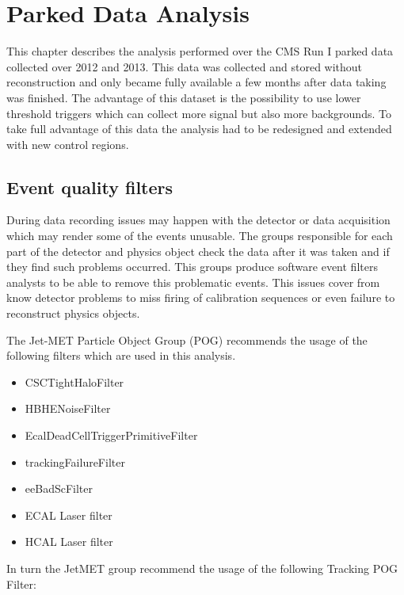 \chapter{Parked Data Analysis}
\label{CHAPTER:ParkedDataAnalysis}

\glsresetall %

This chapter describes the analysis performed over the \gls{CMS} Run I parked data collected over 2012 and 2013. This data was collected and stored without reconstruction and only became fully available a few months after data taking was finished. The advantage of this dataset is the possibility to use lower threshold triggers which can collect more signal but also more backgrounds. To take full advantage of this data the analysis had to be redesigned and extended with new control regions.


\section{Event quality filters}

During data recording issues may happen with the detector or data acquisition which may render some of the events unusable. The groups responsible for each part of the detector and physics object check the data after it was taken and if they find such problems occurred. This groups produce software event filters analysts to be able to remove this problematic events. This issues cover from know detector problems to miss firing of calibration sequences or even failure to reconstruct physics objects.

The Jet-MET Particle Object Group (POG) recommends the usage of the following filters which are used in this analysis.

\begin{itemize}
  \item CSCTightHaloFilter
  \item HBHENoiseFilter
  \item EcalDeadCellTriggerPrimitiveFilter
  \item trackingFailureFilter
  \item eeBadScFilter
  \item ECAL Laser filter
  \item HCAL Laser filter
\end{itemize}

In turn the JetMET group recommend the usage of the following Tracking POG Filter:


